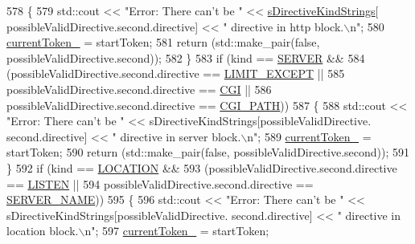 \begin{DoxyCode}
578             \{
579                 std::cout << \textcolor{stringliteral}{"Error: There can't be "} << \hyperlink{namespaceft_a2896a632198d516af93e4aea2d125f59}{sDirectiveKindStrings}[
      possibleValidDirective.second.directive] << \textcolor{stringliteral}{" directive in http block.\(\backslash\)n"};
580                 \hyperlink{classft_1_1_parser_a942c5b794d108f144c5b5028aaa34cb6}{currentToken\_} = startToken;
581                 \textcolor{keywordflow}{return} (std::make\_pair(\textcolor{keyword}{false}, possibleValidDirective.second));
582             \}
583             \textcolor{keywordflow}{if} (kind == \hyperlink{namespaceft_a5a5554dff10f0dc50bae4cc5825ad75da67c96b24b23bcb408bae7626730a04b7}{SERVER} && 
584                 (possibleValidDirective.second.directive == \hyperlink{namespaceft_a5a5554dff10f0dc50bae4cc5825ad75da25b0e84438d71cc28e97f17a01cfde7a}{LIMIT\_EXCEPT} || 
585                 possibleValidDirective.second.directive == \hyperlink{namespaceft_a5a5554dff10f0dc50bae4cc5825ad75da7b2e2f10add9bba874f82f39725423c5}{CGI} || 
586                 possibleValidDirective.second.directive == \hyperlink{namespaceft_a5a5554dff10f0dc50bae4cc5825ad75da874adc6c563690bc7a39ac6a0060e38a}{CGI\_PATH}))
587             \{
588                 std::cout << \textcolor{stringliteral}{"Error: There can't be "} << sDirectiveKindStrings[possibleValidDirective.
      second.directive] << \textcolor{stringliteral}{" directive in server block.\(\backslash\)n"};
589                 \hyperlink{classft_1_1_parser_a942c5b794d108f144c5b5028aaa34cb6}{currentToken\_} = startToken;
590                 \textcolor{keywordflow}{return} (std::make\_pair(\textcolor{keyword}{false}, possibleValidDirective.second));
591             \}
592             \textcolor{keywordflow}{if} (kind == \hyperlink{namespaceft_a5a5554dff10f0dc50bae4cc5825ad75da1e9e3944b93fde52c7c92e1e15dcaf4a}{LOCATION} && 
593                 (possibleValidDirective.second.directive == \hyperlink{namespaceft_a5a5554dff10f0dc50bae4cc5825ad75da331ec9878c0ed22e62de969d4b96b5bb}{LISTEN} || 
594                 possibleValidDirective.second.directive == \hyperlink{namespaceft_a5a5554dff10f0dc50bae4cc5825ad75da8e7adb687472b53e3ed632cbcb949d88}{SERVER\_NAME}))
595             \{
596                 std::cout << \textcolor{stringliteral}{"Error: There can't be "} << sDirectiveKindStrings[possibleValidDirective.
      second.directive] << \textcolor{stringliteral}{" directive in location block.\(\backslash\)n"};
597                 \hyperlink{classft_1_1_parser_a942c5b794d108f144c5b5028aaa34cb6}{currentToken\_} = startToken;

\end{DoxyCode}
